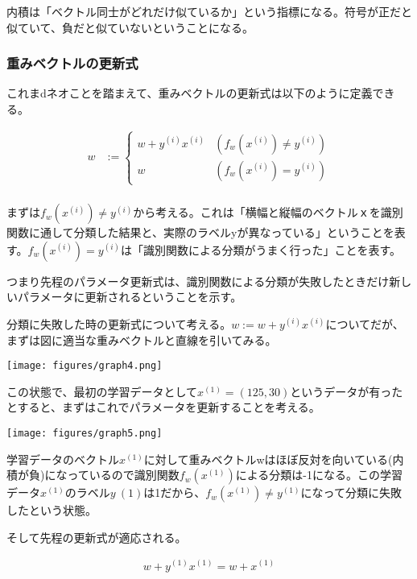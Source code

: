 \documentclass{jsarticle}
\begin{document}
内積は「ベクトル同士がどれだけ似ているか」という指標になる。符号が正だと似ていて、負だと似ていないということになる。

\subsubsection{重みベクトルの更新式}
これまdネオことを踏まえて、重みベクトルの更新式は以下のように定義できる。

\begin{align}
	w &:= \left \{
    	\begin{array}{cc}
        w + y^{(i)} x^{(i)} & (f_w(x^{(i)}) \neq y^{(i)}) \\
        w                   & (f_w(x^{(i)}) = y^{(i)})
        \end{array}
    \right. \\
\end{align}

まずは$f_w(x^{(i)}) \neq y^{(i)}$から考える。これは「横幅と縦幅のベクトルｘを識別関数に通して分類した結果と、実際のラベルyが異なっている」ということを表す。$f_w(x^{(i)}) = y^{(i)}$は「識別関数による分類がうまく行った」ことを表す。

つまり先程のパラメータ更新式は、識別関数による分類が失敗したときだけ新しいパラメータに更新されるということを示す。

分類に失敗した時の更新式について考える。$w := w+y^{(i)}x^{(i)}$についてだが、まずは図に適当な重みベクトルと直線を引いてみる。

\begin{center}
  \texttt{[image: figures/graph4.png]}
\end{center}

この状態で、最初の学習データとして$x^{(1)} = (125,30)$というデータが有ったとすると、まずはこれでパラメータを更新することを考える。

\begin{center}
  \texttt{[image: figures/graph5.png]}
\end{center}

学習データのベクトル$x^{(1)}$に対して重みベクトルwはほぼ反対を向いている(内積が負)になっているので識別関数$f_w(x^{(1)})$による分類は-1になる。この学習データ$x^{(1)}$のラベル$y~{(1)}$は1だから、$f_w(x^{(1)}) \neq y^{(1)}$になって分類に失敗したという状態。

そして先程の更新式が適応される。

\begin{align}
	w + y^{(1)} x^{(1)} = w + x^{(1)}
 \end{align}
 
\end{document}
